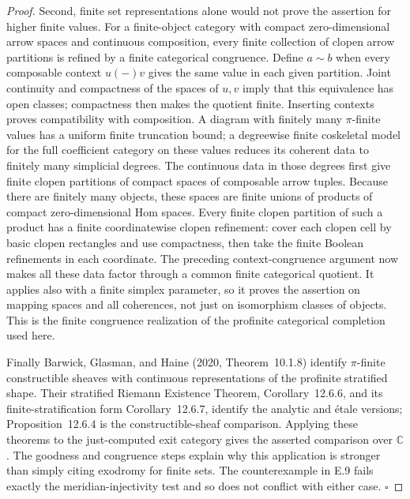 \begin{proof}
Second, finite set representations alone would not prove the assertion for higher finite values. For a finite-object category with compact zero-dimensional arrow spaces and continuous composition, every finite collection of clopen arrow partitions is refined by a finite categorical congruence. Define $a\sim b$ when every composable context $u(-)v$ gives the same value in each given partition. Joint continuity and compactness of the spaces of $u,v$ imply that this equivalence has open classes; compactness then makes the quotient finite. Inserting contexts proves compatibility with composition. A diagram with finitely many $\pi$-finite values has a uniform finite truncation bound; a degreewise finite coskeletal model for the full coefficient category on these values reduces its coherent data to finitely many simplicial degrees. The continuous data in those degrees first give finite clopen partitions of compact spaces of composable arrow tuples. Because there are finitely many objects, these spaces are finite unions of products of compact zero-dimensional Hom spaces. Every finite clopen partition of such a product has a finite coordinatewise clopen refinement: cover each clopen cell by basic clopen rectangles and use compactness, then take the finite Boolean refinements in each coordinate. The preceding context-congruence argument now makes all these data factor through a common finite categorical quotient. It applies also with a finite simplex parameter, so it proves the assertion on mapping spaces and all coherences, not just on isomorphism classes of objects. This is the finite congruence realization of the profinite categorical completion used here.

Finally Barwick, Glasman, and Haine (2020, Theorem~10.1.8) identify $\pi$-finite constructible sheaves with continuous representations of the profinite stratified shape. Their stratified Riemann Existence Theorem, Corollary~12.6.6, and its finite-stratification form Corollary~12.6.7, identify the analytic and étale versions; Proposition~12.6.4 is the constructible-sheaf comparison. Applying these theorems to the just-computed exit category gives the asserted comparison over $\mathbb C$. The goodness and congruence steps explain why this application is stronger than simply citing exodromy for finite sets. The counterexample in E.9 fails exactly the meridian-injectivity test and so does not conflict with either case. \hfill$\square$
\end{proof}

